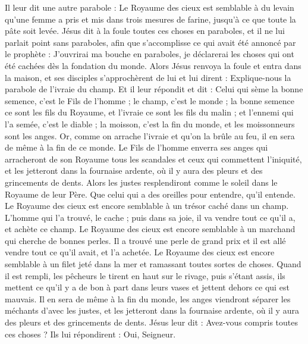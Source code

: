 \begin{multicols}{2}
Il leur dit une autre parabole : Le Royaume des cieux est semblable à du levain qu'une femme a pris et mis dans trois mesures de farine, jusqu'à ce que toute la pâte soit levée.
Jésus dit à la foule toutes ces choses en paraboles, et il ne lui parlait point sans paraboles,
afin que s'accomplisse ce qui avait été annoncé par le prophète : J'ouvrirai ma bouche en paraboles, je déclarerai les choses qui ont été cachées dès la fondation du monde.
Alors Jésus renvoya la foule et entra dans la maison, et ses disciples s'approchèrent de lui et lui dirent : Explique-nous la parabole de l'ivraie du champ.
Et il leur répondit et dit : Celui qui sème la bonne semence, c'est le Fils de l'homme ;
le champ, c'est le monde ; la bonne semence ce sont les fils du Royaume, et l'ivraie ce sont les fils du malin ;
et l'ennemi qui l'a semée, c'est le diable ; la moisson, c'est la fin du monde, et les moissonneurs sont les anges.
Or, comme on arrache l'ivraie et qu'on la brûle au feu, il en sera de même à la fin de ce monde.
Le Fils de l'homme enverra ses anges qui arracheront de son Royaume tous les scandales et ceux qui commettent l'iniquité,
et les jetteront dans la fournaise ardente, où il y aura des pleurs et des grincements de dents.
Alors les justes resplendiront comme le soleil dans le Royaume de leur Père. Que celui qui a des oreilles pour entendre, qu'il entende.
Le Royaume des cieux est encore semblable à un trésor caché dans un champ. L'homme qui l'a trouvé, le cache ; puis dans sa joie, il va vendre tout ce qu'il a, et achète ce champ.
Le Royaume des cieux est encore semblable à un marchand qui cherche de bonnes perles.
Il a trouvé une perle de grand prix et il est allé vendre tout ce qu'il avait, et l'a achetée.
Le Royaume des cieux est encore semblable à un filet jeté dans la mer et ramassant toutes sortes de choses.
Quand il est rempli, les pêcheurs le tirent en haut sur le rivage, puis s'étant assis, ils mettent ce qu'il y a de bon à part dans leurs vases et jettent dehors ce qui est mauvais.
Il en sera de même à la fin du monde, les anges viendront séparer les méchants d'avec les justes,
et les jetteront dans la fournaise ardente, où il y aura des pleurs et des grincements de dents.
Jésus leur dit : Avez-vous compris toutes ces choses ? Ils lui répondirent : Oui, Seigneur.

\end{multicols}
